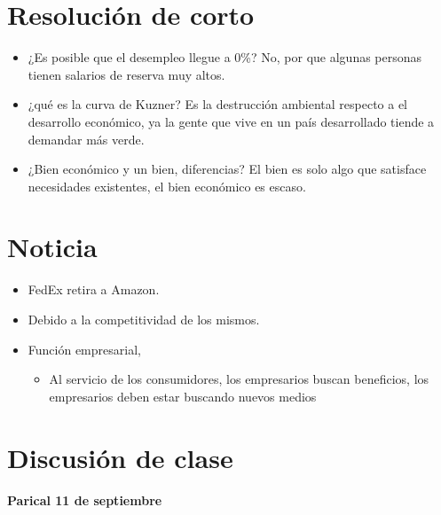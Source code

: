 \section{Resolución de corto}
\begin{itemize}
    \item ¿Es posible que el desempleo llegue a 0\%? No, por que algunas personas tienen salarios de reserva muy altos.
    \item ¿qué es la curva de Kuzner? Es la destrucción ambiental respecto a el desarrollo económico, ya la gente que vive en un país desarrollado tiende a demandar más verde.
    \item ¿Bien económico y un bien, diferencias? El bien es solo algo que satisface necesidades existentes, el bien económico es escaso.
\end{itemize}

\section{Noticia}
\begin{itemize}
    \item FedEx retira a Amazon.
    \item Debido a la competitividad de los mismos.
    \item Función empresarial, 
    \begin{itemize}
        \item Al servicio de los consumidores, los empresarios buscan beneficios, los empresarios deben estar buscando nuevos medios
    \end{itemize}
\end{itemize}

\section{Discusión de clase}
\textbf{Parical 11 de septiembre}

